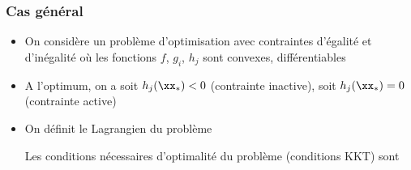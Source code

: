 \documentclass[9pt,table]{beamer} %
\begin{document}
\begin{frame}
\frametitle{Cas général}

\begin{itemize}[label=\tiny$\blacksquare$]
	\item On considère un problème d'optimisation avec contraintes d'égalité et d'inégalité
	où les fonctions $f$, $g_i$, $h_j$ sont \alert{convexes}, \alert{différentiables}
	
	\item A l'optimum, on a soit $h_j(\xx_*) < 0$ (\alert{contrainte inactive}), soit $h_j(\xx_*) = 0$ (\alert{contrainte active})
	
	
	\item On définit le \alert{Lagrangien} du problème
	
	Les conditions nécessaires d'optimalité du problème (\alert{conditions KKT}) sont
\end{itemize}
\end{frame}
\end{document}
